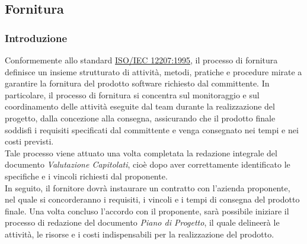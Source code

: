 \subsection{Fornitura}
\subsubsection{Introduzione}
Conformemente allo standard \href{https://www.math.unipd.it/~tullio/IS-1/2009/Approfondimenti/ISO_12207-1995.pdf}{ISO/IEC 12207:1995}, il processo di fornitura definisce un insieme strutturato di attività, metodi, pratiche e procedure mirate a garantire la fornitura del prodotto software richiesto dal committente. 
In particolare, il processo di fornitura si concentra sul monitoraggio e sul coordinamento delle attività eseguite dal team durante la realizzazione del progetto, dalla concezione alla consegna, assicurando che il prodotto finale soddisfi i requisiti specificati dal committente e venga consegnato nei tempi e nei costi previsti. \\
Tale processo viene attuato una volta completata la redazione integrale del documento \textit{Valutazione Capitolati}, cioè dopo aver correttamente identificato le specifiche e i vincoli richiesti dal proponente. \\
In seguito, il fornitore dovrà instaurare un contratto con l'azienda proponente, nel quale si concorderanno i requisiti, i vincoli e i tempi di consegna del prodotto finale. Una volta concluso l'accordo con il proponente, sarà possibile iniziare il processo di redazione del documento
\textit{Piano di Progetto}, il quale delineerà le attività, le risorse e i costi indispensabili per la realizzazione del prodotto.


